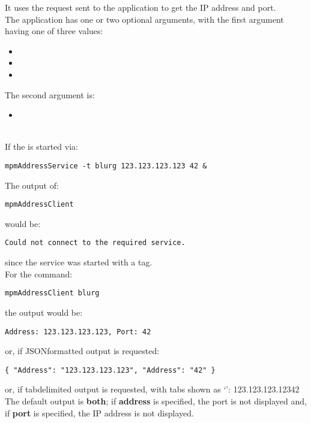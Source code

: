 It uses the  request sent to the
 application to get the IP address and port.\\

The application has one or two optional arguments, with the first argument having one of
three values:
\begin{itemize}
\item{}
\item\exSp{}
\item\exSp{}
\end{itemize}
The second argument is:
\begin{itemize}
\item{}
\end{itemize}

\insertFullClientParameters\\

If the  is started via:
\outputBegin
\begin{verbatim}
mpmAddressService -t blurg 123.123.123.123 42 &
\end{verbatim}
\outputEnd{}
The output of:
\outputBegin
\begin{verbatim}
mpmAddressClient
\end{verbatim}
\outputEnd{}
would be:
\outputBegin
\begin{verbatim}
Could not connect to the required service.
\end{verbatim}
\outputEnd{}
since the service was started with a tag.\\

For the command:
\outputBegin
\begin{verbatim}
mpmAddressClient blurg
\end{verbatim}
\outputEnd{}
the output would be:
\outputBegin
\begin{verbatim}
Address: 123.123.123.123, Port: 42
\end{verbatim}
\outputEnd{}
or, if JSON\longDash{}formatted output is requested:
\outputBegin
\begin{verbatim}
{ "Address": "123.123.123.123", "Address": "42" }
\end{verbatim}
\outputEnd{}
or, if tab\longDash{}delimited output is requested, with tabs shown as `\tabSymbol':
\outputBegin{}
123.123.123.123\pseudotab{}42
\outputEnd{}
The default output is \textbf{both}; if \textbf{address} is specified, the port is not
displayed and, if \textbf{port} is specified, the IP address is not displayed.

